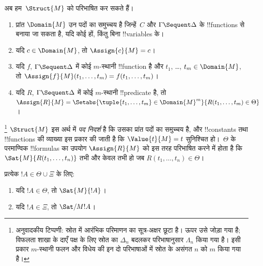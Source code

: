 \documentclass[../../../include/open-logic-section]{subfiles}
\begin{document}
अब हम~$\Struct{M}$ को परिभाषित कर सकते हैं।
\begin{enumerate}
\item प्रांत $\Domain{M}$ उन पदों का समुच्चय है जिन्हें~$C$ और $\Gamma
\Sequent \Delta$ के !!{function}s से बनाया जा सकता है, यदि कोई हों, किंतु
बिना !!{variable}s के।
\item यदि $c \in \Domain{M}$, तो $\Assign{c}{M} = c$।
\item यदि $f$, $\Gamma \Sequent \Delta$ में कोई $m$-स्थानी !!{function} है और
$t_1$, \dots, $t_m \in \Domain{M}$, तो $\Assign{f}{M}(t_1, \dots, t_m) =
f(t_1, \dots, t_m)$।
\item यदि $R$, $\Gamma \Sequent \Delta$ में कोई $m$-स्थानी !!{predicate} है,
तो $\Assign{R}{M} = \Setabs{\tuple{t_1, \dots, t_m} \in
\Domain{M}^m}{R(t_1, \dots, t_m) \in \Theta}$।
\end{enumerate}
\footnote{अनुवादकीय टिप्पणी: स्रोत में आरंभिक परिमाणन का सूत्र-अक्षर छूटा है।
ऊपर उसे जोड़ा गया है; विफलता शाखा के दाएँ पक्ष के लिए स्रोत का
$\Delta_n$ बदलकर परिभाषानुसार $\Lambda_n$ किया गया है। इसी प्रकार
$m$-स्थानी फलन और विधेय की इन दो परिभाषाओं में स्रोत के असंगत
$n$ को $m$ किया गया है।}
$\Struct{M}$ इस अर्थ में \emph{पद निदर्श} है कि उसका प्रांत पदों का समुच्चय
है, और !!{constant}s तथा !!{function}s की व्याख्या इस प्रकार की जाती है कि
$\Value{t}{M} = t$ सुनिश्चित हो।~$\Theta$ के परमाण्विक !!{formula}s का उपयोग
$\Assign{R}{M}$ को इस तरह परिभाषित करने में होता है कि
$\Sat{M}{R(t_1, \dots, t_n)}$ तभी और केवल तभी हो जब $R(t_1, \dots, t_n)
\in \Theta$।

\begin{lem}
प्रत्येक $!A \in \Theta \cup \Xi$ के लिए:
\begin{enumerate}
  \item यदि $!A \in \Theta$, तो $\Sat{M}{!A}$।
  \item यदि $!A \in \Xi$, तो $\Sat/{M}{!A}$।
\end{enumerate}
\end{lem}
\end{document}
